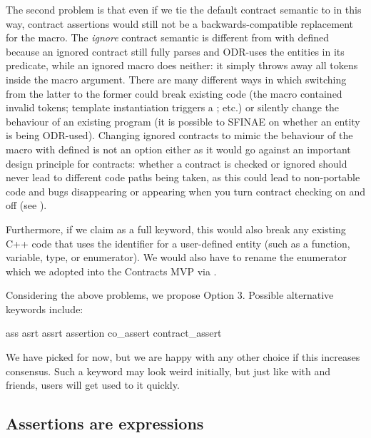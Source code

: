 The second problem is that even if we tie the default contract semantic to  in this way, contract assertions would still not be a backwards-compatible replacement for the  macro. The \emph{ignore} contract semantic is different from  with  defined because an ignored contract still fully parses and ODR-uses the entities in its predicate, while an ignored  macro does neither: it simply throws away all tokens inside the macro argument. There are many different ways in which switching from the latter to the former could break existing code (the macro contained invalid tokens; template instantiation triggers a ; etc.) or silently change the behaviour of an existing program (it is possible to SFINAE on  whether an entity is being ODR-used). Changing ignored contracts to mimic the behaviour of the  macro with  defined is not an option either as it would go against an important design principle for contracts: whether a contract is checked or ignored should never lead to different code paths being taken, as this could lead to non-portable code and bugs disappearing or appearing when you turn contract checking on and off (see \cite{P2834R1}).

Furthermore, if we claim  as a full keyword, this would also break any existing C++ code that uses the identifier  for a user-defined entity (such as a function, variable, type, or enumerator). We would also have to rename the enumerator \mbox{} which we adopted into the Contracts MVP via \cite{P2811R7}.

Considering the above problems, we propose Option 3. Possible alternative keywords include:

\begin{codeblock}
ass                         
asrt                        
assrt                       
assertion                   
co_assert
contract_assert
\end{codeblock}

We have picked  for now, but we are happy with any other choice if this increases consensus. Such a keyword may look weird initially, but just like with  and friends, users will get used to it quickly.


\subsection{Assertions are expressions}
\label{subsec:assrtxpr}

